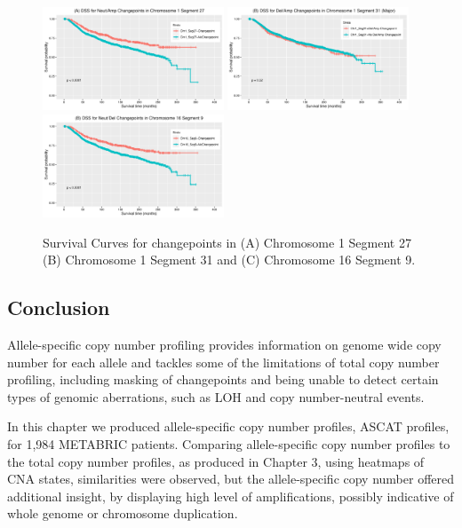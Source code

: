 \begin{figure}[!htb]
\centering
\includegraphics[width = 0.48\textwidth]{../figures/Chapter_6/survplot_Chr1Seg27.png}
\includegraphics[width = 0.48\textwidth]{../figures/Chapter_6/survplot_Chr1Seg31.png}
\includegraphics[width = 0.48\textwidth]{../figures/Chapter_6/survplot_Chr16Seg9.png}
\caption[Survival Curves for changepoints in (A) Chromosome 1 Segment 27 (B) Chromosome 1 Segment 31 and (C) Chromosome 16 Segment 9]{Survival Curves for changepoints in (A) Chromosome 1 Segment 27 (B) Chromosome 1 Segment 31 and (C) Chromosome 16 Segment 9.}
\label{fig:TopLength_Segments_Surv}
\end{figure}

\subsection{Conclusion}
Allele-specific copy number profiling provides information on genome wide copy number for each allele and tackles some of the limitations of total copy number profiling, including masking of changepoints and being unable to detect certain types of genomic aberrations, such as LOH and copy number-neutral events.

In this chapter we produced allele-specific copy number profiles, ASCAT profiles, for 1,984 METABRIC patients. Comparing allele-specific copy number profiles to the total copy number profiles, as produced in Chapter 3, using heatmaps of CNA states, similarities were observed, but the allele-specific copy number offered additional insight, by displaying high level of amplifications, possibly indicative of whole genome or chromosome duplication. 

